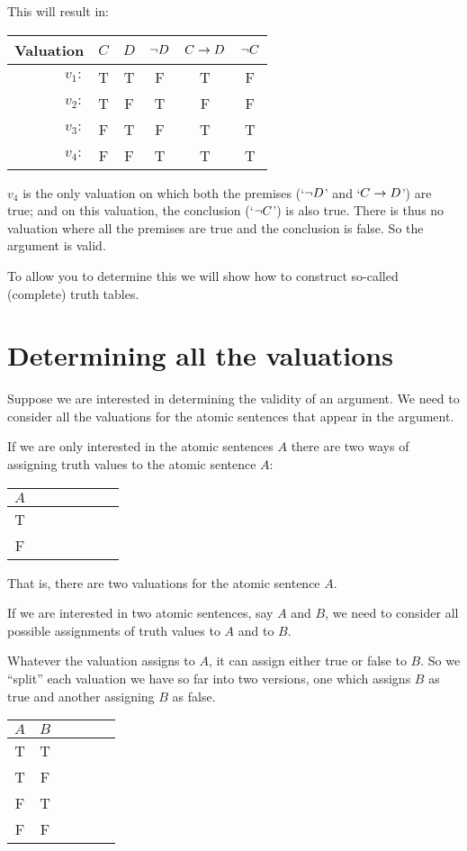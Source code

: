 This will result in:
 \begin{center}
	\begin{tabular}{rcc||c|c||c}
		Valuation&$C$&$D$&$\neg D$&$C\rightarrow D$&$\neg C$\\\hline
		$v_1:$&T & T & F & T & F\\
		$v_2:$&T & F & T & F & F\\
		$v_3:$&F & T & F & T & T\\
		$v_4:$&F & F & {T}& {T} & {T}
	\end{tabular}
\end{center}

$v_4$ is the only valuation on which both the premises (`$\neg D$' and `$C\rightarrow D$') are true; and on this valuation, the conclusion (`$\neg C$') is also true. 
There is thus no valuation where all the premises are true and the conclusion is false. So the argument is valid. 

To allow you to determine this we will show how to construct so-called (complete) truth tables. 
 
\section{Determining all the valuations}

Suppose we are interested in determining the validity of an argument. We need to consider all the valuations for the atomic sentences that appear in the argument. 


If we are only interested in the atomic sentences $A$ there are two ways of assigning truth values to the atomic sentence $A$:
\begin{center}
	\begin{tabular}{ccccccc}
		$A$\\\hline
		T\\
		F 
	\end{tabular}
\end{center}
That is, there are two valuations for the atomic sentence $A$. 

If we are interested in two atomic sentences, say $A$ and $B$, we need to consider all possible assignments of truth values to $A$ and to $B$. 

Whatever the valuation assigns to $A$, it can assign either true or false to $B$. So we ``split'' each valuation we have so far into two versions, one which assigns $B$ as true and another assigning $B$ as false. 

\begin{center}
	\begin{tabular}{cccccc}
		 $A$&$B$\\\hline
	T&T\\
	T&F\\
	F&T\\
	F&F
	\end{tabular}
\end{center}


